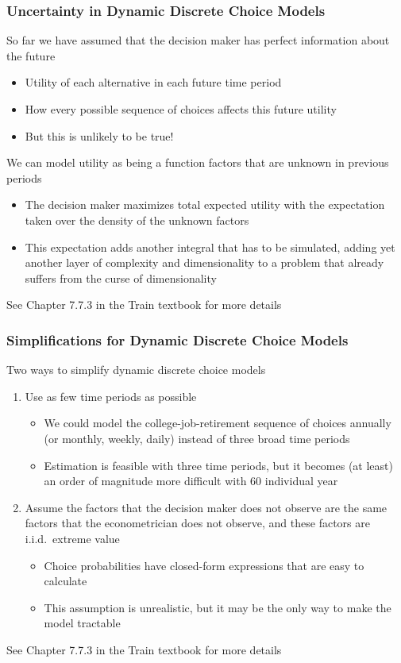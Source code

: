 \documentclass{beamer}
\begin{document}
\begin{frame}\frametitle{Uncertainty in Dynamic Discrete Choice Models}
    So far we have assumed that the decision maker has perfect information about the future
    \begin{itemize}
        \item Utility of each alternative in each future time period
        \item How every possible sequence of choices affects this future utility
        \item But this is unlikely to be true!
    \end{itemize}
    \vspace{2ex}
    We can model utility as being a function factors that are unknown in previous periods
    \begin{itemize}
        \item The decision maker maximizes total expected utility with the expectation taken over the density of the unknown factors
        \item This expectation adds another integral that has to be simulated, adding yet another layer of complexity and dimensionality to a problem that already suffers from the curse of dimensionality
    \end{itemize}
    \vspace{2ex}
    See Chapter 7.7.3 in the Train textbook for more details
\end{frame}

\begin{frame}\frametitle{Simplifications for Dynamic Discrete Choice Models}
    Two ways to simplify dynamic discrete choice models
    \begin{enumerate}
        \item Use as few time periods as possible
        \begin{itemize}
            \item We could model the college-job-retirement sequence of choices annually (or monthly, weekly, daily) instead of three broad time periods
            \item Estimation is feasible with three time periods, but it becomes (at least) an order of magnitude more difficult with 60 individual year
        \end{itemize}
        \item Assume the factors that the decision maker does not observe are the same factors that the econometrician does not observe, and these factors are i.i.d.\ extreme value
        \begin{itemize}
            \item Choice probabilities have closed-form expressions that are easy to calculate
            \item This assumption is unrealistic, but it may be the only way to make the model tractable
        \end{itemize}
    \end{enumerate}
    \vspace{2ex}
    See Chapter 7.7.3 in the Train textbook for more details
\end{frame}
\end{document}
